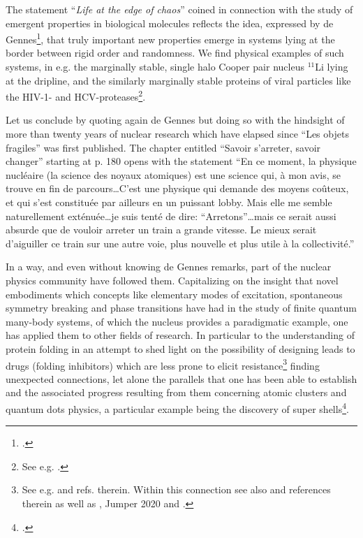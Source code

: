 The statement ``\textit{Life at the edge of chaos}'' coined in connection with the study of emergent properties in biological molecules reflects the idea,  expressed by de Gennes\footnote{\cite{DeGennes:94}.}, that truly important new properties  emerge in systems lying at the border between rigid order and randomness.  We find physical examples of such systems, in e.g. the marginally stable, single  halo Cooper pair nucleus $^{11}$Li lying at the dripline, and the similarly marginally stable proteins of   viral particles like the HIV-1- and HCV-proteases\footnote{See e.g. \cite{Broglia:13b}.}.


 Let us conclude by quoting again de Gennes but doing so with the hindsight of more than twenty years of nuclear research which have elapsed since ``Les objets fragiles'' was first published. The chapter entitled  ``Savoir s'arreter, savoir changer'' starting at p. 180 opens with the statement ``En ce moment, la physique nucl\'eaire (la science des noyaux atomiques) est une science qui, \`a mon avis, se trouve en fin de parcours\dots C'est une physique qui demande des moyens co\^uteux, et qui s'est constitu\'ee par ailleurs en un puissant lobby. Mais elle me semble naturellement ext\'enu\'ee\dots je suis tent\'e de dire: ``Arretons''\dots mais ce serait aussi absurde que de vouloir arreter un train a grande vitesse. Le mieux serait d'aiguiller ce train sur une autre voie, plus nouvelle et plus utile \`a la collectivit\'e.''


In a way, and even without knowing de Gennes remarks, part of the nuclear physics community have followed them. Capitalizing on the insight that novel embodiments which concepts like elementary modes of excitation, spontaneous symmetry breaking and phase transitions have had in the study of finite quantum many-body systems, of which the nucleus provides a paradigmatic example, one has applied them to other fields of research. In particular to the understanding of protein folding in an attempt to shed light on the possibility of designing leads to  drugs (folding inhibitors) which are less prone to elicit resistance\footnote{See e.g. \cite{Broglia:05,Rosner:17} and refs. therein. Within this connection see also \cite{Bergasa:20} and references therein as well as \cite{Service:20} \cite{reviewservice}\cite{reviewservice},  Jumper 2020 and \cite{Broglia:01b}.} finding  unexpected connections, let alone  the parallels that one has been able to establish and the associated progress resulting from them concerning atomic clusters  and quantum dots physics, a particular example being the discovery of super shells\footnote{\cite{Pedersen:91,deHeer:87,Brack:93,Pacheco:91,Lipparini:03,Martin:94,Bjornholm:94}.}.







